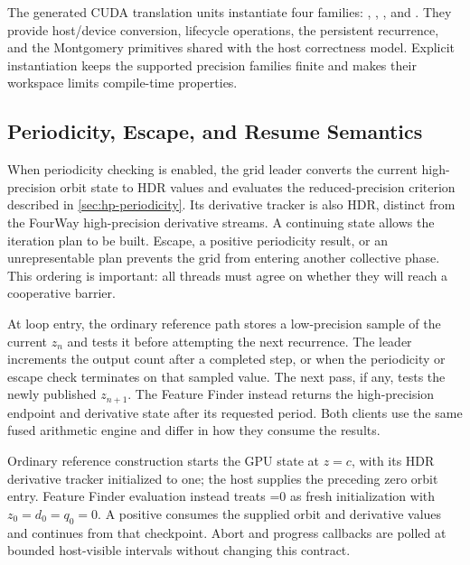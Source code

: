 The generated CUDA translation units instantiate four families:
, ,
, and .  They provide
host/device conversion, lifecycle operations, the persistent recurrence, and
the Montgomery primitives shared with the host correctness model.  Explicit
instantiation keeps the supported precision families finite and makes their
workspace limits compile-time properties.

\subsection{Periodicity, Escape, and Resume Semantics}
\label{subsec:fused-ntt-periodicity}

When periodicity checking is enabled, the grid leader converts the current
high-precision orbit state to HDR values and evaluates the reduced-precision
criterion described in \cref{sec:hp-periodicity}.  Its derivative tracker is
also HDR, distinct from the FourWay high-precision derivative streams.
A continuing state allows the iteration plan to be built.  Escape, a positive periodicity result,
or an unrepresentable plan prevents the grid from entering another collective
phase.  This ordering is important: all threads must agree on whether they will
reach a cooperative barrier.

At loop entry, the ordinary reference path stores a low-precision sample of
the current $z_n$ and tests it before attempting the next recurrence.  The
leader increments the output count after a completed step, or when the
periodicity or escape check terminates on that sampled value.  The
next pass, if any, tests the newly published $z_{n+1}$.  The
Feature Finder instead returns the high-precision endpoint and derivative
state after its requested period.  Both clients use the same fused arithmetic
engine and differ in how they consume the results.

Ordinary reference construction starts the GPU state at $z=c$, with its HDR
derivative tracker initialized to one; the host supplies the preceding zero
orbit entry.  Feature Finder evaluation instead treats =0 as
fresh initialization with $z_0=d_0=q_0=0$.  A positive  consumes
the supplied orbit and derivative values and continues from that checkpoint.  Abort and progress callbacks are
polled at bounded host-visible intervals without changing this contract.

